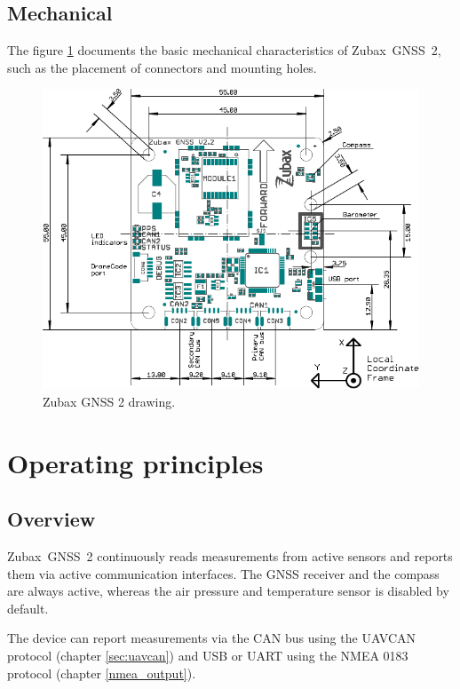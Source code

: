 \documentclass{zubaxdoc}
\begin{document}
\section{Mechanical}\label{sec:mechanical}

The figure \ref{drawing} documents the basic mechanical characteristics of Zubax~GNSS~2,
such as the placement of connectors and mounting holes.

\begin{figure}[!hbt]
    \center
	\includegraphics[width=1\textwidth]{GNSS2_drawing}
	\caption{Zubax GNSS 2 drawing.\label{drawing}}
\end{figure}

\chapter{Operating principles}

\section{Overview}

Zubax~GNSS~2 continuously reads measurements from active sensors and reports them via
active communication interfaces.
The GNSS receiver and the compass are always active,
whereas the air pressure and temperature sensor is disabled by default.

The device can report measurements via the CAN bus using the UAVCAN protocol (chapter \ref{sec:uavcan}) and
USB or UART using the NMEA 0183 protocol (chapter \ref{nmea_output}).
\end{document}
